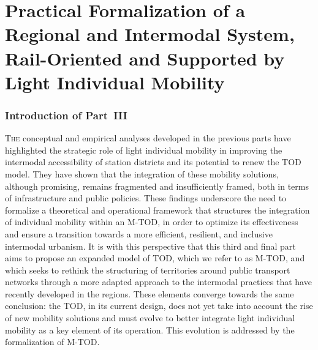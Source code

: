 \part{Practical Formalization of a Regional and Intermodal System, Rail-Oriented and Supported by Light Individual Mobility
    \label{part3:titre}
    }

\cleardoublepage
\section*{Introduction of Part~III
    \label{part3:introduction}
    }

\lettrine[lines=3, findent=8pt, nindent=0pt]{ T}{he} conceptual and empirical analyses developed in the previous parts have highlighted the strategic role of light individual mobility in improving the intermodal accessibility of station districts and its potential to renew the \acrshort{TOD} model. They have shown that the integration of these mobility solutions, although promising, remains fragmented and insufficiently framed, both in terms of infrastructure and public policies. These findings underscore the need to formalize a theoretical and operational framework that structures the integration of individual mobility within an \acrshort{M-TOD}, in order to optimize its effectiveness and ensure a transition towards a more efficient, resilient, and inclusive intermodal urbanism. It is with this perspective that this third and final part aims to propose an expanded model of \acrshort{TOD}, which we refer to as \acrfull{M-TOD}, and which seeks to rethink the structuring of territories around public transport networks through a more adapted approach to the intermodal practices that have recently developed in the regions. These elements converge towards the same conclusion: the \acrshort{TOD}, in its current design, does not yet take into account the rise of new mobility solutions and must evolve to better integrate light individual mobility as a key element of its operation. This evolution is addressed by the formalization of \acrshort{M-TOD}.%

